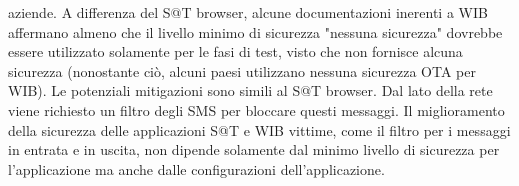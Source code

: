 aziende. A differenza del S@T browser, alcune documentazioni inerenti a WIB affermano almeno che il livello minimo di sicurezza "nessuna sicurezza" dovrebbe essere utilizzato solamente per le fasi di test, visto che non fornisce alcuna sicurezza (nonostante ciò, alcuni paesi utilizzano nessuna sicurezza OTA per WIB). Le potenziali mitigazioni sono simili al S@T browser. Dal lato della rete viene richiesto un filtro degli SMS per bloccare questi messaggi. Il miglioramento della sicurezza delle applicazioni S@T e WIB vittime, come il filtro per i messaggi in entrata e in uscita, non dipende solamente dal minimo livello di sicurezza per l'applicazione ma anche dalle configurazioni dell'applicazione.